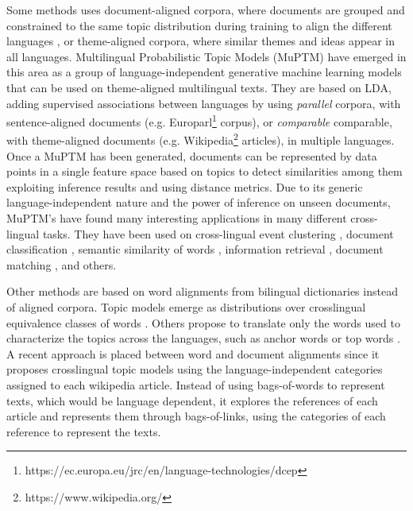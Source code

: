 Some methods uses document-aligned corpora, where documents are grouped and constrained to the same topic distribution during training to align the different languages \citep{Smet2009, mimno-etal-2009-polylingual, Ni2009, Fukumasu2012, Zhang2013}, or theme-aligned corpora, where similar themes and ideas appear in all languages\citep{Graber2009}. Multilingual Probabilistic Topic Models (MuPTM) \citep{Vulic2015} have emerged in this area as a group of language-independent generative machine learning models that can be used on theme-aligned multilingual texts. They are based on LDA, adding supervised associations between languages by using \textit{parallel} corpora, with sentence-aligned documents (e.g. Europarl\footnote{https://ec.europa.eu/jrc/en/language-technologies/dcep} corpus), or \textit{comparable} comparable, with theme-aligned documents (e.g. Wikipedia\footnote{https://www.wikipedia.org/} articles), in multiple languages. Once a MuPTM has been generated, documents can be represented by data points in a single feature space based on topics to detect similarities among them exploiting inference results and using distance metrics. Due to its generic language-independent nature and the power of inference on unseen documents, MuPTM's have found many interesting applications in many different cross-lingual tasks. They have been used on cross-lingual event clustering \citep{DeSmet2009}, document classification \citep{10.1007/978-3-642-20841-6_45, Ni:2011:CLT:1935826.1935887},  semantic similarity of words \citep{Mimno:2009:PTM:1699571.1699627, Vulic:2012:DHC:2380816.2380872}, information retrieval \citep{10.1007/978-3-642-36973-5_9, ganguly-etal-2012-cross}, document matching \citep{Platt:2010:TDR:1870658.1870683, zhu-etal-2013-building}, and others. 

Other methods are based on word alignments from bilingual dictionaries instead of aligned corpora. Topic models emerge as distributions over crosslingual equivalence classes of words \citep{Jagarlamudi2010, zhang-etal-2010-cross, shi-etal-2016-detecting, hao-paul-2018-learning}. Others propose to translate only the words used to characterize the topics across the languages, such as anchor words \citep{NEURIPS2018_28b9f8aa} or top words \citep{yang2019multilingual}. A recent approach is placed between word and document alignments since it proposes crosslingual topic models using the language-independent categories assigned to each wikipedia article\citep{2020arXiv200911207P}. Instead of using bags-of-words to represent texts, which would be language dependent, it explores the references of each article and represents them through bags-of-links, using the categories of each reference to represent the texts.

